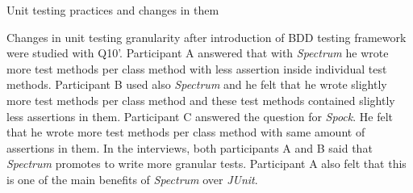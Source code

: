     \begin{table}[H]
             \caption {Unit testing practices and changes in them} \label{tab:changes-pt8}
     \end{table}

Changes in unit testing granularity after introduction of BDD testing framework were studied with Q10'. Participant A
answered that with \textit{Spectrum} he wrote more test methods per class method with less assertion inside individual
test methods. Participant B used also \textit{Spectrum} and he felt that he wrote slightly more test methods per class method and
these test methods contained slightly less assertions in them.
Participant C answered the question for \textit{Spock}. He felt that he wrote more test methods per class method with same amount of assertions in them.
In the interviews, both participants A and B said that
\textit{Spectrum} promotes to write more granular tests. Participant A also felt that this is one of the main benefits of \textit{Spectrum} over
\textit{JUnit}.

